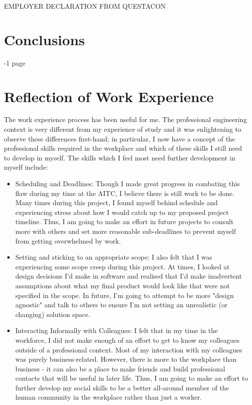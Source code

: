 \documentclass[11pt]{article}
\begin{document}
EMPLOYER DECLARATION FROM QUESTACON

\newpage

\section{Conclusions}
-1 page

\newpage

\section{Reflection of Work Experience}
The work experience process has been useful for me. The professional engineering context is very different from my experience of study and it was enlightening to observe these differences first-hand; in particular, I now have a concept of the professional skills required in the workplace and which of these skills I still need to develop in myself. The skills which I feel most need further development in myself include: \\

\begin{itemize}

\item Scheduling and Deadlines: Though I made great progress in combating this flaw during my time at the AITC, I believe there is still work to be done. Many times during this project, I found myself behind schedule and experiencing stress about how I would catch up to my proposed project timeline. Thus, I am going to make an effort in future projects to consult more with others and set more reasonable sub-deadlines to prevent myself from getting overwhelmed by work. 

\item Setting and sticking to an appropriate scope: I also felt that I was experiencing some scope creep during this project. At times, I looked at design decisions I'd make in software and realised that I'd make inadvertent assumptions about what my final product would look like that were not specified in the scope. In future, I'm going to attempt to be more "design agnostic" and talk to others to ensure I'm not setting an unrealistic (or changing) solution space.

\item Interacting Informally with Colleagues: I felt that in my time in the workforce, I did not make enough of an effort to get to know my colleagues outside of a professional context. Most of my interaction with my colleagues was purely business-related. However, there is more to the workplace than business - it can also be a place to make friends and build professional contacts that will be useful in later life. Thus, I am going to make an effort to further develop my social skills to be a better all-around member of the human community in the workplace rather than just a worker. 

\end{itemize}
\end{document}
